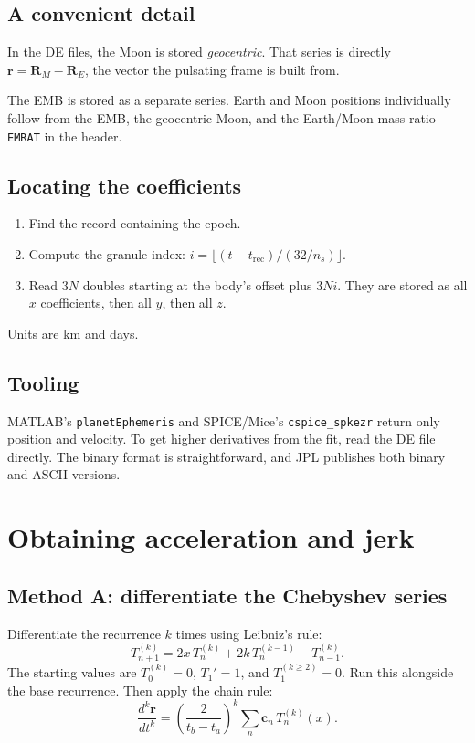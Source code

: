 \documentclass[11pt]{article}
\newcommand{\vr}{\bm{r}}
\newcommand{\vR}{\bm{R}}
\begin{document}
\subsection{A convenient detail}

In the DE files, the Moon is stored \emph{geocentric}. That series is directly $\vr = \vR_M - \vR_E$, the vector the pulsating frame is built from.

The EMB is stored as a separate series. Earth and Moon positions individually follow from the EMB, the geocentric Moon, and the Earth/Moon mass ratio \texttt{EMRAT} in the header.

\subsection{Locating the coefficients}

\begin{enumerate}
  \item Find the record containing the epoch.
  \item Compute the granule index: $i = \lfloor (t - t_{\mathrm{rec}})/(32/n_s)\rfloor$.
  \item Read $3N$ doubles starting at the body's offset plus $3Ni$. They are stored as all $x$ coefficients, then all $y$, then all $z$.
\end{enumerate}
Units are km and days.

\subsection{Tooling}

MATLAB's \texttt{planetEphemeris} and SPICE/Mice's \texttt{cspice\_spkezr} return only position and velocity. To get higher derivatives from the fit, read the DE file directly. The binary format is straightforward, and JPL publishes both binary and ASCII versions.

\section{Obtaining acceleration and jerk}
\label{sec:accjerk}

\subsection{Method A: differentiate the Chebyshev series}

Differentiate the recurrence $k$ times using Leibniz's rule:
\begin{equation}
T_{n+1}^{(k)} = 2x\,T_n^{(k)} + 2k\,T_n^{(k-1)} - T_{n-1}^{(k)}.
\end{equation}
The starting values are $T_0^{(k)} = 0$, $T_1' = 1$, and $T_1^{(k\ge 2)} = 0$. Run this alongside the base recurrence. Then apply the chain rule:
\begin{equation}
\frac{d^k\vr}{dt^k} = \left(\frac{2}{t_b - t_a}\right)^{k}\sum_n \mathbf c_n\,T_n^{(k)}(x).
\end{equation}
\end{document}
